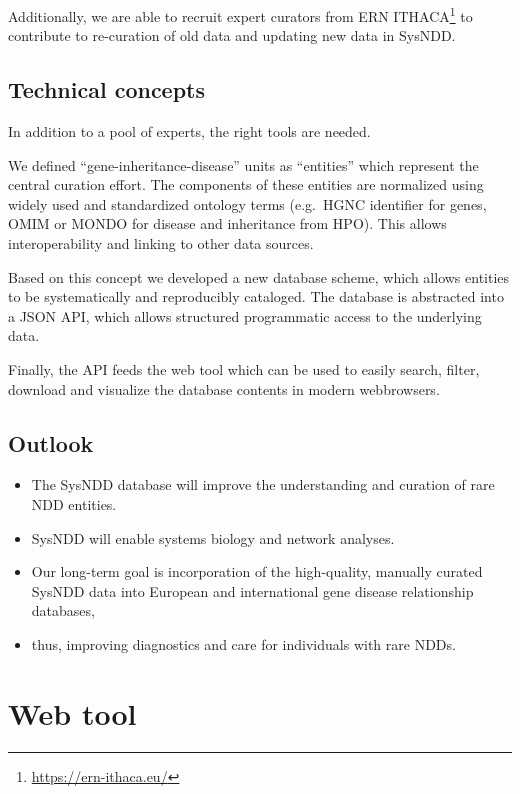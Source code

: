 \documentclass[
]{article}
\renewcommand{\href}[2]{#2\footnote{\url{#1}}}
\begin{document}
Additionally, we are able to recruit expert curators from \href{https://ern-ithaca.eu/}{ERN ITHACA} to contribute to re-curation of old data and updating new data in SysNDD.

\hypertarget{technical-concepts}{%
\subsection{Technical concepts}\label{technical-concepts}}

In addition to a pool of experts, the right tools are needed.

We defined ``gene-inheritance-disease'' units as ``entities'' which represent the central curation effort. The components of these entities are normalized using widely used and standardized ontology terms (e.g.~HGNC identifier for genes, OMIM or MONDO for disease and inheritance from HPO). This allows interoperability and linking to other data sources.

Based on this concept we developed a new database scheme, which allows entities to be systematically and reproducibly cataloged.
The database is abstracted into a JSON API, which allows structured programmatic access to the underlying data.

Finally, the API feeds the web tool which can be used to easily search, filter, download and visualize the database contents in modern webbrowsers.

\hypertarget{outlook}{%
\subsection{Outlook}\label{outlook}}

\begin{itemize}
\item
  The SysNDD database will improve the understanding and curation of rare NDD entities.
\item
  SysNDD will enable systems biology and network analyses.
\item
  Our long-term goal is incorporation of the high-quality, manually curated SysNDD data into European and international gene disease relationship databases,
\item
  thus, improving diagnostics and care for individuals with rare NDDs.
\end{itemize}

\hypertarget{web-tool}{%
\section{Web tool}\label{web-tool}}
\end{document}
